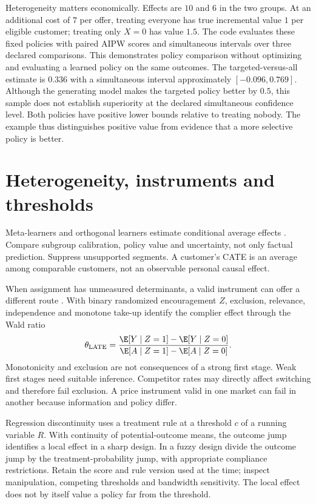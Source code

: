 Heterogeneity matters economically. Effects are $10$ and $6$ in the two
groups. At an additional cost of $7$ per offer, treating everyone has true
incremental value $1$ per eligible customer; treating only $X=0$ has
value $1.5$. The code evaluates these fixed policies with paired AIPW scores
and simultaneous intervals over three declared comparisons.
This demonstrates policy comparison without optimizing and evaluating a
learned policy on the same outcomes.
The targeted-versus-all estimate is $0.336$ with a simultaneous interval
approximately $[-0.096,0.769]$. Although the generating model makes the
targeted policy better by $0.5$, this sample does not establish superiority
at the declared simultaneous confidence level. Both policies have positive
lower bounds relative to treating nobody. The example thus distinguishes
positive value from evidence that a more selective policy is better.

\section{Heterogeneity, instruments and thresholds}
Meta-learners and orthogonal learners estimate conditional average effects
\citep{kunzel2019,dml2018}. Compare subgroup calibration, policy value and
uncertainty, not only factual prediction. Suppress unsupported segments.
A customer's CATE is an average among comparable customers, not an
observable personal causal effect.

When assignment has unmeasured determinants, a valid instrument can offer
a different route \citep{applied2024}. With binary randomized encouragement $Z$, exclusion,
relevance, independence and monotone take-up identify the complier effect
through the Wald ratio
\begin{equation}
 \theta_{\mathrm{LATE}}=
 \frac{\E[Y\mid Z=1]-\E[Y\mid Z=0]}
      {\E[A\mid Z=1]-\E[A\mid Z=0]}.
 \label{eq:wald}
\end{equation}
Monotonicity and exclusion are not consequences of a strong first stage.
Weak first stages need suitable inference. Competitor rates may directly
affect switching and therefore fail exclusion. A price instrument valid in
one market can fail in another because information and policy differ.

Regression discontinuity uses a treatment rule at a threshold $c$ of a
running variable $R$. With continuity of potential-outcome means, the
outcome jump identifies a local effect in a sharp design. In a fuzzy design
divide the outcome jump by the treatment-probability jump, with appropriate
compliance restrictions. Retain the score and rule version used at the time;
inspect manipulation, competing thresholds and bandwidth sensitivity.
The local effect does not by itself value a policy far from the threshold.

